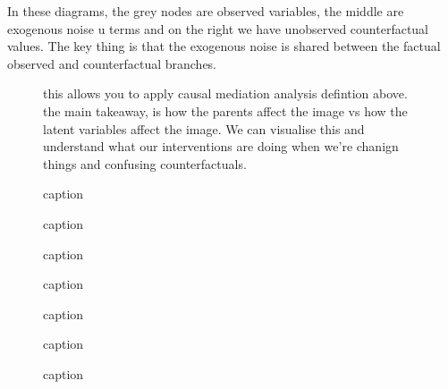 \documentclass[11pt]{article}
\begin{document}
In these diagrams, the grey nodes are observed variables, the middle are exogenous noise u terms and on the right we have unobserved counterfactual values. The key thing is that the exogenous noise is shared between the factual observed and counterfactual branches.

\begin{figure}[H]
    \centering
    \caption{this allows you to apply causal mediation analysis defintion above. the main takeaway, is how the parents affect the image vs how the latent variables affect the image. We can visualise this and understand what our interventions are doing when we're chanign things and confusing counterfactuals.}
\end{figure}

\begin{figure}[H]
    \centering
    \caption{caption}
\end{figure}

\begin{figure}[H]
    \centering
    \caption{caption}
\end{figure}

\begin{figure}[H]
    \centering
    \caption{caption}
\end{figure}

\begin{figure}[H]
    \centering
    \caption{caption}
\end{figure}

\begin{figure}[H]
    \centering
    \caption{caption}
\end{figure}

\begin{figure}[H]
    \centering
    \caption{caption}
\end{figure}

\begin{figure}[H]
    \centering
    \caption{caption}
\end{figure}
\end{document}
